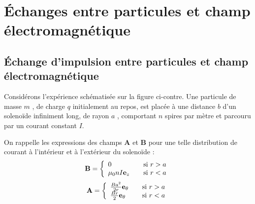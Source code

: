 \chapter{Échanges entre particules et champ électromagnétique}
\section{Échange d'impulsion entre particules et champ électromagnétique}%
\begin{minipage}[c]{.65\linewidth}
\hspace{0.5cm}Considérons l'expérience schématisée sur la figure ci-contre. Une particule de masse $m$ , de charge $q$ initialement au repos, est placée à une
distance $b$ d'un solenoïde infiniment long, de rayon $a$ , comportant $n$ spires
par mètre et parcouru par un courant constant $I$.

\hspace{0.5cm}On rappelle les expressions des champs {\bf A} et {\bf B} pour une telle distribution
de courant à l'intérieur et à l'extérieur du solenoïde :
\[
{\bf B} =\left\{
  \begin{array}{lcr}
   0 &  & \text{si}\ r > a \\
   \mu_0nI {\bf e}_z &  & \text{si}\ r < a \\
  \end{array}
\right.\]
\[
{\bf A} =\left\{
  \begin{array}{lcr}
 \frac{Ba^2}{2r} {\bf e}_\theta &  & \text{si}\ r > a \\
 \frac{Br}{2} {\bf e}_\theta &  & \text{si}\ r < a \\
  \end{array}
\right.\]
\end{minipage}
\hfill
\begin{minipage}[c]{.25\linewidth}
\begin{center}
\end{center}
\end{minipage}


